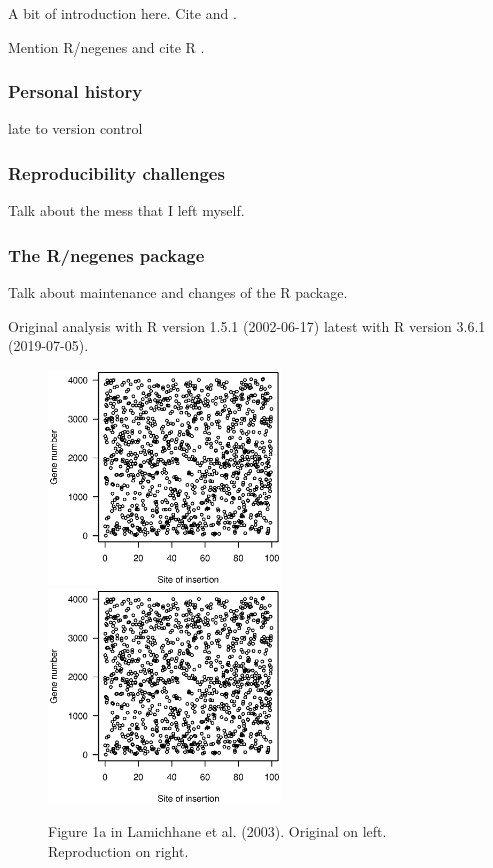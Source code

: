 \begin{quote}
\small
\articleABSTRACT
\end{quote}



A bit of introduction here. Cite \citet{lamichhane2003}
and \citet{blades2002}.

Mention R/negenes \citep{negenes} and cite R \citep{R}.

\subsubsection{Personal history}

late to version control

\subsubsection{Reproducibility challenges}

Talk about the mess that I left myself.

\subsubsection{The R/negenes package}

Talk about maintenance and changes of the R package.

Original analysis with R version 1.5.1 (2002-06-17)
latest with R version 3.6.1 (2019-07-05).


\begin{figure}

\includegraphics[viewport=133 224 464 528, width=0.55\textwidth]{../original/Nov02/R/Figs/fig1.ps}
\hfill
\includegraphics[viewport=133 224 464 528, width=0.55\textwidth]{../reproduction/Figs/fig1.ps}

\caption{Figure 1a in Lamichhane et al. (2003). Original on left. Reproduction on right.}

\end{figure}

